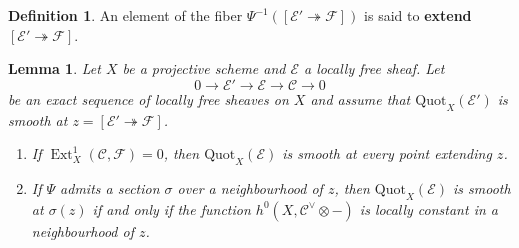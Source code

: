 \documentclass[leqno,11pt,a4paper]{amsart}
\newtheorem{lemma}[lemma]{Lemma}
\theoremstyle{definition}
\newtheorem{definition}[definition]{Definition}
\numberwithin{equation}{section}
\newcommand{\Quot}{\mathrm{Quot}}
\newcommand{\EE}{\mathscr{E}}
\newcommand{\CC}{\mathscr{C}}
\newcommand{\FF}{\mathscr{F}}
\DeclareMathOperator{\Ext}{Ext}
\begin{document}
\begin{definition} 
An element of the fiber $\Psi^{-1}([\EE' \twoheadrightarrow \FF])$ is said to \textbf{extend} $[\EE' \twoheadrightarrow \FF]$.
\end{definition}

\begin{lemma} \label{fibration}
Let $X$ be a projective scheme and $\EE$ a locally free sheaf.
Let
$$
0\to\mathscr E'\to\mathscr E\to\mathscr C\to0
$$
be an exact sequence of locally free sheaves on $X$ and assume that $\Quot_X(\EE')$ is smooth at $z=[\EE' \twoheadrightarrow \FF]$.
\begin{enumerate}
\item If $\Ext^1_X(\CC,\FF) = 0$, then $\Quot_X(\EE)$ is smooth at every point extending $z$.
\item If $\Psi$ admits a section $\sigma$ over a neighbourhood of $z$, then $\Quot_X(\EE)$ is smooth at $\sigma(z)$ if and only if the function $h^0(X, \CC^\vee \otimes -)$ is locally constant in a neighbourhood of $z$.
\end{enumerate}
\end{lemma}
\end{document}
